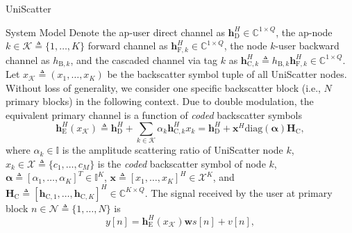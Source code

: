 \documentclass[journal]{IEEEtran}
\begin{document}
\begin{section}{UniScatter}
\begin{subsection}{System Model}
		Denote the \gls{ap}-user direct channel as $\boldsymbol{h}_{\mathrm{D}}^H \in \mathbb{C}^{1 \times Q}$, the \gls{ap}-node $k \in \mathcal{K} \triangleq \{1,\ldots,K\}$ forward channel as $\boldsymbol{h}_{\mathrm{F},k}^H \in \mathbb{C}^{1 \times Q}$, the node $k$-user backward channel as $h_{\mathrm{B},k}$, and the cascaded channel via tag $k$ as $\boldsymbol{h}_{\mathrm{C},k}^H \triangleq h_{\mathrm{B},k} \boldsymbol{h}_{\mathrm{F},k}^H \in \mathbb{C}^{1 \times Q}$.
		Let $x_{\mathcal{K}} \triangleq (x_1,\ldots,x_K)$ be the backscatter symbol tuple of all UniScatter nodes.
		Without loss of generality, we consider one specific backscatter block (i.e., $N$ primary blocks) in the following context.
		Due to double modulation, the equivalent primary channel is a function of \emph{coded} backscatter symbols
		\begin{equation}
			\boldsymbol{h}_{\mathrm{E}}^H(x_{\mathcal{K}}) \triangleq \boldsymbol{h}_{\mathrm{D}}^H + \sum_{k \in \mathcal{K}} \alpha_k \boldsymbol{h}_{\mathrm{C},k}^H x_k = \boldsymbol{h}_{\mathrm{D}}^H + \boldsymbol{x}^H \mathrm{diag}(\boldsymbol{\alpha}) \boldsymbol{H}_{\mathrm{C}},
			\label{eq:equivalent_channel}
		\end{equation}
		where $\alpha_k \in \mathbb{I}$ is the amplitude scattering ratio of UniScatter node $k$, $x_k \in \mathcal{X} \triangleq \{c_1,\ldots,c_M\}$ is the \emph{coded} backscatter symbol of node $k$, $\boldsymbol{\alpha} \triangleq [\alpha_1,\ldots,\alpha_K]^T \in \mathbb{I}^{K}$, $\boldsymbol{x} \triangleq [x_1,\ldots,x_K]^H \in \mathcal{X}^{K}$, and $\boldsymbol{H}_{\mathrm{C}} \triangleq [\boldsymbol{h}_{\mathrm{C},1},\ldots,\boldsymbol{h}_{\mathrm{C},K}]^H \in \mathbb{C}^{K \times Q}$. The signal received by the user at primary block $n \in \mathcal{N} \triangleq \{1,\ldots,N\}$ is
		\begin{equation}
			y[n] = \boldsymbol{h}_{\mathrm{E}}^H(x_{\mathcal{K}}) \boldsymbol{w} s[n] + v[n],

\end{equation}
\end{subsection}
\end{section}
\end{document}
